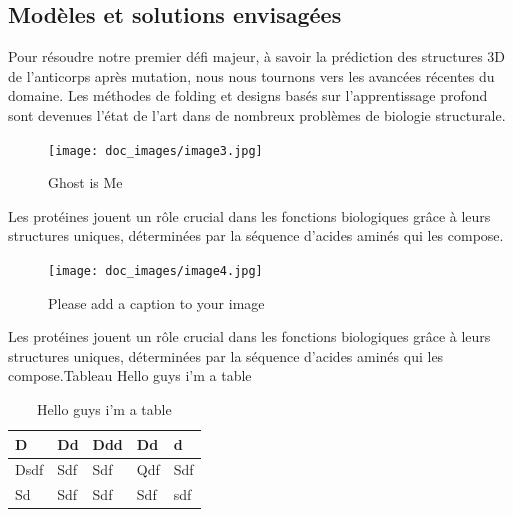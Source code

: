 \documentclass{article}
\begin{document}
\subsection{Modèles et solutions envisagées}
Pour résoudre notre premier défi majeur, à savoir la prédiction des structures 3D de l’anticorps après mutation, nous nous tournons vers les avancées récentes du domaine. Les méthodes de folding et designs basés sur l’apprentissage profond sont devenues l’état de l’art dans de nombreux problèmes de biologie structurale.\begin{figure}[H]
\centering
\texttt{[image: doc\_images/image3.jpg]}
\caption{\label{Ghost_is_Me} Ghost is Me}\end{figure}Les protéines jouent un rôle crucial dans les fonctions biologiques grâce à leurs structures uniques, déterminées par la séquence d’acides aminés qui les compose.\begin{figure}[H]
\centering
\texttt{[image: doc\_images/image4.jpg]}
\caption{\label{Please_add_a_caption_to_your_image} Please add a caption to your image}\end{figure}Les protéines jouent un rôle crucial dans les fonctions biologiques grâce à leurs structures uniques, déterminées par la séquence d’acides aminés qui les compose.Tableau Hello guys i'm a table\begin{table}[H]
\centering
\begin{tabular}{|p{3.20cm}|p{3.20cm}|p{3.20cm}|p{3.20cm}|p{3.20cm}|}
\hline
D & Dd & Ddd & Dd & d \\
\hline
Dsdf & Sdf & Sdf & Qdf & Sdf \\
\hline
Sd & Sdf & Sdf & Sdf & sdf \\
\hline
\end{tabular}
\caption{Hello guys i'm a table}
\label{table_1}
\end{table}
\end{document}
